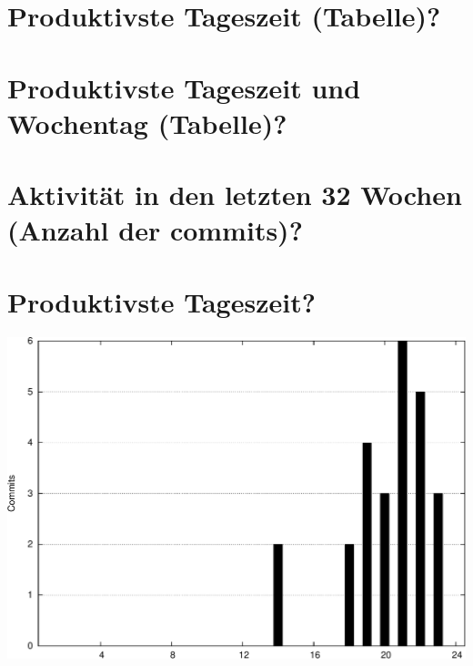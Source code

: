 \documentclass[12pt,a4paper,ngerman]{scrartcl}
\begin{document}
\pagestyle{empty}

\begin{landscape}
\section*{Produktivste Tageszeit (Tabelle)?}
\hspace{-4cm}%
%

\section*{Produktivste Tageszeit und Wochentag (Tabelle)?}%
%

\section*{Aktivität in den letzten 32 Wochen (Anzahl der commits)?}%
%
\end{landscape}

\section*{Produktivste Tageszeit?}%
\includegraphics[width=14cm]{stats/hour_of_day-crop}%
\end{document}
